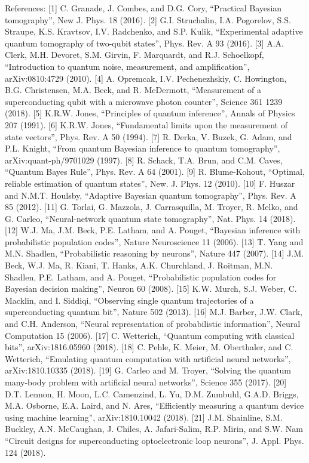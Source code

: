 \documentclass[twocolumn]{article}
\begin{document}
References: 
[1] C. Granade, J. Combes, and D.G. Cory, “Practical Bayesian tomography”, New J. Phys. 18 (2016).
[2] G.I. Struchalin, I.A. Pogorelov, S.S. Straupe, K.S. Kravtsov, I.V. Radchenko, and S.P. Kulik, “Experimental adaptive quantum tomography of two-qubit states”, Phys. Rev. A 93 (2016). 
[3] A.A. Clerk, M.H. Devoret, S.M. Girvin, F. Marquardt, and R.J. Schoelkopf, “Introduction to quantum noise, measurement, and amplification”, arXiv:0810:4729 (2010).
[4] A. Opremcak, I.V. Pechenezhskiy, C. Howington, B.G. Christensen, M.A. Beck, and R. McDermott, “Measurement of a superconducting qubit with a microwave photon counter”, Science 361 1239 (2018).
[5] K.R.W. Jones, “Principles of quantum inference”, Annals of Physics 207 (1991).
[6] K.R.W. Jones, “Fundamental limits upon the measurement of state vectors”, Phys. Rev. A 50 (1994).
[7] R. Derka, V. Buzek, G. Adam, and P.L. Knight, “From quantum Bayesian inference to quantum tomography”, arXiv:quant-ph/9701029 (1997). 
[8] R. Schack, T.A. Brun, and C.M. Caves, “Quantum Bayes Rule”, Phys. Rev. A 64 (2001).
[9] R. Blume-Kohout, “Optimal, reliable estimation of quantum states”, New. J. Phys. 12 (2010).
[10] F. Huszar and N.M.T. Houlsby, “Adaptive Bayesian quantum tomography”, Phys. Rev. A 85 (2012).
[11] G. Torlai, G. Mazzola, J. Carrasquilla, M. Troyer, R. Melko, and G. Carleo, “Neural-network quantum state tomography”, Nat. Phys. 14 (2018).
[12] W.J. Ma, J.M. Beck, P.E. Latham, and A. Pouget, “Bayesian inference with probabilistic population codes”, Nature Neuroscience 11 (2006).
[13] T. Yang and M.N. Shadlen, “Probabilistic reasoning by neurons”, Nature 447 (2007).
[14] J.M. Beck, W.J. Ma, R. Kiani, T. Hanks, A.K. Churchland, J. Roitman, M.N. Shadlen, P.E. Latham, and A. Pouget, “Probabilistic population codes for Bayesian decision making”, Neuron 60 (2008).
[15] K.W. Murch, S.J. Weber, C. Macklin, and I. Siddiqi, “Observing single quantum trajectories of a superconducting quantum bit”, Nature 502 (2013).
[16] M.J. Barber, J.W. Clark, and C.H. Anderson, “Neural representation of probabilistic information”, Neural Computation 15 (2006).
[17] C. Wetterich, “Quantum computing with classical bits”, arXiv:1816.05960 (2018).
[18] C. Pehle, K. Meier, M. Oberthaler, and C. Wetterich, “Emulating quantum computation with artificial neural networks”, arXiv:1810.10335 (2018). 
[19] G. Carleo and M. Troyer, “Solving the quantum many-body problem with artificial neural networks”, Science 355 (2017). 
[20] D.T. Lennon, H. Moon, L.C. Camenzind, L. Yu, D.M. Zumbuhl, G.A.D. Briggs, M.A. Osborne, E.A. Laird, and N. Ares, “Efficiently measuring a quantum device using machine learning”, arXiv:1810.10042 (2018). 
[21] J.M. Shainline, S.M. Buckley, A.N. McCaughan, J. Chiles, A. Jafari-Salim, R.P. Mirin, and S.W. Nam “Circuit designs for superconducting optoelectronic loop neurons”, J. Appl. Phys. 124 (2018).
\end{document}
